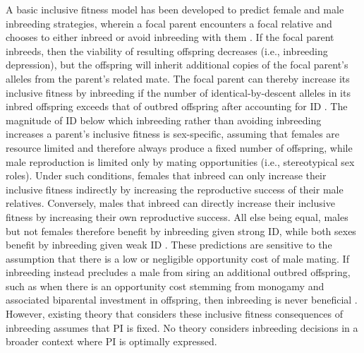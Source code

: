 \documentclass[10pt,letterpaper]{article}
\begin{document}
A basic inclusive fitness model has been developed to predict female and male inbreeding strategies, wherein a focal parent encounters a focal relative and chooses to either inbreed or avoid inbreeding with them \cite[][]{Parker1979, Parker2006, Kokko2006, Duthie2015a}. If the focal parent inbreeds, then the viability of resulting offspring decreases (i.e., inbreeding depression), but the offspring will inherit additional copies of the focal parent's alleles from the parent's related mate. The focal parent can thereby increase its inclusive fitness by inbreeding if the number of identical-by-descent alleles in its inbred offspring exceeds that of outbred offspring after accounting for ID \cite[][]{Parker1979, Parker2006, Kokko2006, Szulkin2012, Duthie2015a}. The magnitude of ID below which inbreeding rather than avoiding inbreeding increases a parent's inclusive fitness is sex-specific, assuming that females are resource limited and therefore always produce a fixed number of offspring, while male reproduction is limited only by mating opportunities (i.e., stereotypical sex roles). Under such conditions, females that inbreed can only increase their inclusive fitness indirectly by increasing the reproductive success of their male relatives. Conversely, males that inbreed can directly increase their inclusive fitness by increasing their own reproductive success. All else being equal, males but not females therefore benefit by inbreeding given strong ID, while both sexes benefit by inbreeding given weak ID \cite[][]{Parker1979, Parker2006, Kokko2006, Duthie2015a}. These predictions are sensitive to the assumption that there is a low or negligible opportunity cost of male mating. If inbreeding instead precludes a male from siring an additional outbred offspring, such as when there is an opportunity cost stemming from monogamy and associated biparental investment in offspring, then inbreeding is never beneficial \cite[][]{Waser1986}. However, existing theory that considers these inclusive fitness consequences of inbreeding assumes that PI is fixed. No theory considers inbreeding decisions in a broader context where PI is optimally expressed.
\end{document}
